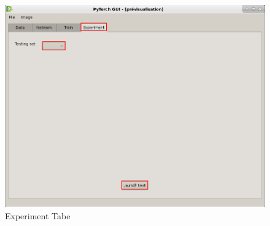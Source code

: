 \begin{figure}[!ht]
    \center
    \includegraphics[scale=0.5]{figures/app_screen_shoots/Experiment_tab.png}
    \caption{Experiment Tabe}
\end{figure}


\\\
\\\
\\\
\\\
\\\
\\\